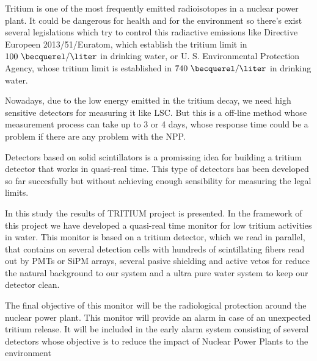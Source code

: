 Tritium is one of the most frequently emitted radioisotopes in a nuclear power plant. It could be dangerous for health and for the environment so there's exist several legislations which try to control this radiactive emissions like Directive Europeen 2013/51/Euratom, which establish the tritium limit in $100~\becquerel/\liter$ in drinking water, or U. S. Environmental Protection Agency, whose tritium limit is established in $740~\becquerel/\liter$ in drinking water.

Nowadays, due to the low energy emitted in the tritium decay, we need high sensitive detectors for measuring it like LSC. But this is a off-line method whose measurement process can take up to 3 or 4 days, whose response time could be a problem if there are any problem with the NPP.

Detectors based on solid scintillators is a promissing idea for building a tritium detector that works in quasi-real time. This type of detectors has been developed so far succesfully but without achieving enough sensibility for measuring the legal limits.

In this study the results of TRITIUM project is presented. In the framework of this project we have developed a quasi-real time monitor for low tritium activities in water. This monitor is based on a tritium detector, which we read in parallel, that contains on several detection cells with hundreds of scintillating fibers read out by PMTs or SiPM arrays, several pasive shielding and active vetos for reduce the natural background to our system and a ultra pure water system to keep our detector clean.

The final objective of this monitor will be the radiological protection around the nuclear power plant. This monitor will provide an alarm in case of an unexpected tritium release. It will be included in the early alarm system consisting of several detectors whose objective is to reduce the impact of Nuclear Power Plants to the environment

